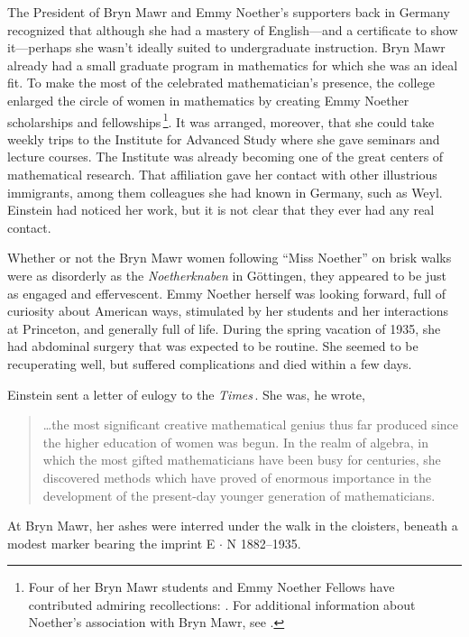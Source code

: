 \documentclass[twoside,symmetric]{tufte-handout}
\begin{document}
The President of Bryn Mawr and  Emmy Noether's supporters back in Germany recognized that although she had a mastery of English---and a certificate to show it---perhaps she wasn't ideally suited to undergraduate instruction. Bryn Mawr already had a small graduate program in mathematics for which she was an ideal fit.  To make the most of the celebrated mathematician's presence, the college enlarged the circle of women in mathematics by creating Emmy Noether scholarships and fellowships$\,$\footnote{Four of her Bryn Mawr students and Emmy Noether Fellows have contributed admiring recollections: . For additional information about Noether's association with Bryn Mawr, see .}. It was arranged, moreover, that she could take weekly trips to the Institute for Advanced Study where she gave seminars and lecture courses. The Institute was already becoming one of the great centers of mathematical research. That affiliation gave her contact with other illustrious immigrants, among them colleagues she had known in Germany, such as Weyl. Einstein had noticed her work, but it is not clear that they ever had any real contact.

Whether or not the Bryn Mawr women following ``Miss Noether'' on brisk walks were as disorderly as the \emph{Noetherknaben} in G\"ottingen, they appeared to be just as engaged and effervescent. Emmy Noether herself was looking forward, full of curiosity about American ways, stimulated by her students and her interactions at Princeton, and generally full of life. During the spring vacation of 1935, she had abdominal surgery that was expected to be routine. She seemed to be recuperating well, but suffered complications and  died within a few days.

Einstein sent a letter of eulogy to the \emph{Times}$\,$\cite{AEonEN}. She was, he wrote,
\begin{quote}\ldots the most significant creative mathematical genius thus far produced since the higher education of women was begun. In the realm of algebra, in which the most
gifted mathematicians have been busy for centuries, she discovered methods which have proved of enormous importance in the development of the present-day younger generation of mathematicians.
\end{quote}
At Bryn Mawr, her ashes were interred under the walk in the cloisters, beneath  a modest marker bearing the imprint E $\cdot$ N 1882--1935.
\end{document}

